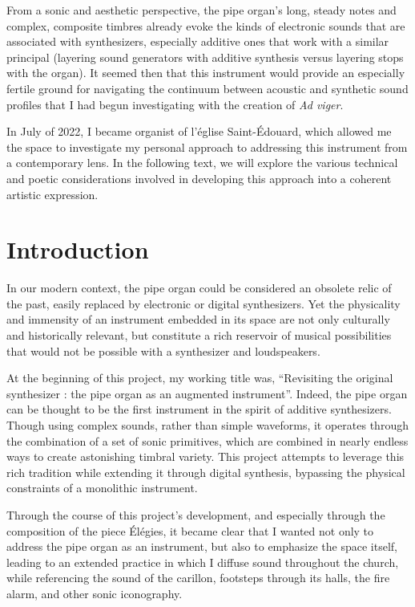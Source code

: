\documentclass[12pt,twoside,maitrise]{dms_ks}
\theoremstyle{definition}
\begin{document}
{ From a sonic and aesthetic perspective, the pipe organ's long, steady notes and complex, composite timbres already evoke the kinds of electronic sounds that are associated with synthesizers, especially additive ones that work with a similar principal (layering sound generators with additive synthesis versus layering stops with the organ). 
It seemed then that this instrument would provide an especially fertile ground for navigating the continuum between acoustic and synthetic sound profiles that I had begun investigating with the creation of \textit{Ad viger}.

In July of 2022, I became organist of l'église Saint-Édouard, which allowed me the space to investigate my personal approach to addressing this instrument from a contemporary lens. In the following text, we will explore the various technical and poetic considerations involved in developing this approach into a coherent artistic expression. 

\chapter*{Introduction}

In our modern context, the pipe organ could be considered an obsolete relic of the past, easily replaced by electronic or digital synthesizers. 
Yet the physicality and immensity of an instrument embedded in its space are not only culturally and historically relevant, but constitute a rich reservoir of musical possibilities that would not be possible with a synthesizer and loudspeakers. 

At the beginning of this project, my working title was, “Revisiting the original synthesizer : the pipe organ as an augmented instrument”. 
Indeed, the pipe organ can be thought to be the first instrument in the spirit of additive synthesizers. 
Though using complex sounds, rather than simple waveforms, it operates through the combination of a set of sonic primitives, which are combined in nearly endless ways to create astonishing timbral variety. 
This project attempts to leverage this rich tradition while extending it through digital synthesis, bypassing the physical constraints of a monolithic instrument.	

Through the course of this project’s development, and especially through the composition of the piece Élégies, it became clear that I wanted not only to address the pipe organ as an instrument, but also to emphasize the space itself, leading to an extended practice in which I diffuse sound throughout the church, while referencing the sound of the carillon, footsteps through its halls, the fire alarm, and other sonic iconography. 	

}
\end{document}
